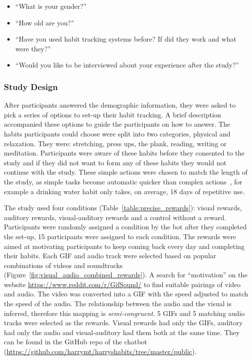 \begin{itemize}
  \item ``What is your gender?''
    \item ``How old are you?''
    \item ``Have you used habit tracking systems before? If did they work and what were they?''
    \item ``Would you like to be interviewed about your experience after the study?''
\end{itemize}


\subsubsection{Study Design}
After participants answered the demographic information, they were asked to pick a series of options to set-up their habit tracking. A brief description accompanied these options to guide the participants on how to answer. The habits participants could choose were split into two categories, physical and relaxation. They were: stretching, press ups, the plank, reading, writing or meditation. Participants were aware of these habits before they consented to the study and if they did not want to form any of these habits they would not continue with the study. These simple actions were chosen to match the length of the study, as simple tasks become automatic quicker than complex actions~\cite{article_how_habits_formed_modelling_habit_formation}, for example a drinking water habit only takes, on average, 18 days of repetitive use.

The study used four conditions (Table~\ref{table:precise_rewards}): visual rewards, auditory rewards, visual-auditory rewards and a control without a reward. Participants were randomly assigned a condition by the bot after they completed the set-up, 15 participants were assigned to each condition. The rewards were aimed at motivating participants to keep coming back every day and completing their habits. Each GIF and audio track were selected based on popular combinations of videos and soundtracks (Figure~\ref{fig:visual_audio_combined_rewards}). A search for ``motivation'' on the website \url{https://www.reddit.com/r/GifSound/} to find suitable pairings of video and audio. The video was converted into a GIF with the speed adjusted to match the speed of the audio. The relationship between the audio and the visual is inferred, therefore this mapping is \textit{semi-congruent}. 5 GIFs and 5 matching audio tracks were selected as the rewards. Visual rewards had only the GIFs, auditory had only the audio and visual-auditory had them both at the same time. They can be found in the GitHub repo of the chatbot (\url{https://github.com/harrymt/harryshabits/tree/master/public}).

